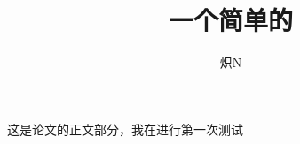 \documentclass[12pt,a4paper]{article}%
\title{一个简单的\LaTeX测试}%
\author{炽N}%
\begin{document}
\maketitle%
这是论文的正文部分，我在进行第一次测试
\end{document}
